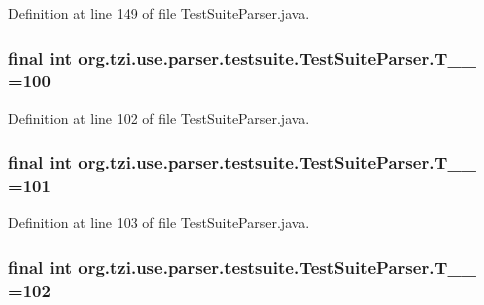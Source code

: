 Definition at line 149 of file Test\-Suite\-Parser.\-java.

\hypertarget{classorg_1_1tzi_1_1use_1_1parser_1_1testsuite_1_1_test_suite_parser_a4f11b4d0c57283c70d290afa79574d6b}{
\subsubsection[{T\-\_\-\-\_\-100}]{\setlength{\rightskip}{0pt plus 5cm}final int org.\-tzi.\-use.\-parser.\-testsuite.\-Test\-Suite\-Parser.\-T\-\_\-\-\_ =100\hspace{0.3cm}{\ttfamily [static]}}}\label{classorg_1_1tzi_1_1use_1_1parser_1_1testsuite_1_1_test_suite_parser_a4f11b4d0c57283c70d290afa79574d6b}


Definition at line 102 of file Test\-Suite\-Parser.\-java.

\hypertarget{classorg_1_1tzi_1_1use_1_1parser_1_1testsuite_1_1_test_suite_parser_ae15a2f2ed46c6712631317320057ce6c}{
\subsubsection[{T\-\_\-\-\_\-101}]{\setlength{\rightskip}{0pt plus 5cm}final int org.\-tzi.\-use.\-parser.\-testsuite.\-Test\-Suite\-Parser.\-T\-\_\-\-\_ =101\hspace{0.3cm}{\ttfamily [static]}}}\label{classorg_1_1tzi_1_1use_1_1parser_1_1testsuite_1_1_test_suite_parser_ae15a2f2ed46c6712631317320057ce6c}


Definition at line 103 of file Test\-Suite\-Parser.\-java.

\hypertarget{classorg_1_1tzi_1_1use_1_1parser_1_1testsuite_1_1_test_suite_parser_a68c94487afc4741213bb75f128b87ec3}{
\subsubsection[{T\-\_\-\-\_\-102}]{\setlength{\rightskip}{0pt plus 5cm}final int org.\-tzi.\-use.\-parser.\-testsuite.\-Test\-Suite\-Parser.\-T\-\_\-\-\_ =102\hspace{0.3cm}{\ttfamily [static]}}}\label{classorg_1_1tzi_1_1use_1_1parser_1_1testsuite_1_1_test_suite_parser_a68c94487afc4741213bb75f128b87ec3}


